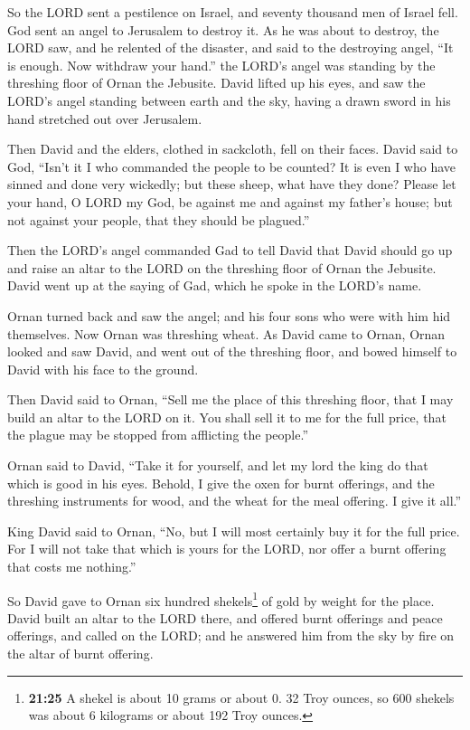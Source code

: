  So the LORD sent a pestilence on Israel, and seventy
thousand men of Israel fell.  God sent an angel to
Jerusalem to destroy it. As he was about to destroy, the LORD saw, and
he relented of the disaster, and said to the destroying angel, ``It is
enough. Now withdraw your hand.'' the LORD's angel was standing by the
threshing floor of Ornan the Jebusite.  David lifted up
his eyes, and saw the LORD's angel standing between earth and the sky,
having a drawn sword in his hand stretched out over Jerusalem.

Then David and the elders, clothed in sackcloth, fell on their faces.
 David said to God, ``Isn't it I who commanded the people
to be counted? It is even I who have sinned and done very wickedly; but
these sheep, what have they done? Please let your hand, O LORD my God,
be against me and against my father's house; but not against your
people, that they should be plagued.''

 Then the LORD's angel commanded Gad to tell David that
David should go up and raise an altar to the LORD on the threshing floor
of Ornan the Jebusite.  David went up at the saying of
Gad, which he spoke in the LORD's name.

 Ornan turned back and saw the angel; and his four sons
who were with him hid themselves. Now Ornan was threshing wheat.
 As David came to Ornan, Ornan looked and saw David, and
went out of the threshing floor, and bowed himself to David with his
face to the ground.

 Then David said to Ornan, ``Sell me the place of this
threshing floor, that I may build an altar to the LORD on it. You shall
sell it to me for the full price, that the plague may be stopped from
afflicting the people.''

 Ornan said to David, ``Take it for yourself, and let my
lord the king do that which is good in his eyes. Behold, I give the oxen
for burnt offerings, and the threshing instruments for wood, and the
wheat for the meal offering. I give it all.''

 King David said to Ornan, ``No, but I will most
certainly buy it for the full price. For I will not take that which is
yours for the LORD, nor offer a burnt offering that costs me nothing.''

 So David gave to Ornan six hundred shekels\footnote{\textbf{21:25}
  A shekel is about 10 grams or about 0. 32 Troy ounces, so 600 shekels
  was about 6 kilograms or about 192 Troy ounces.} of gold by weight for
the place.  David built an altar to the LORD there, and
offered burnt offerings and peace offerings, and called on the LORD; and
he answered him from the sky by fire on the altar of burnt offering.

